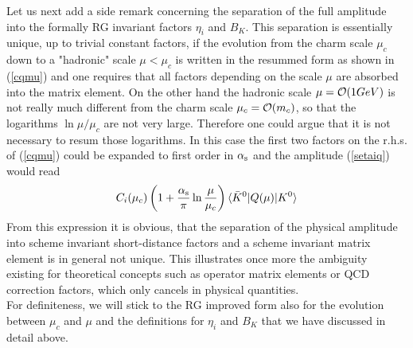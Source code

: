 Let us next add a side remark concerning the separation of the
full amplitude into the formally RG invariant factors $\eta_i$
and $B_K$.
This separation is essentially unique, up to trivial constant factors,
if the evolution from the charm scale $\mu_c$ down to a "hadronic"
scale $\mu<\mu_c$ is written in the resummed form as shown in
(\ref{cqmu}) and one requires that all factors depending on the scale
$\mu$ are absorbed into the matrix element. On the other hand the
hadronic scale $\mu={\cal O}(1 GeV)$ is not really much different
from the charm scale $\mu_c={\cal O}(m_c)$, so that the logarithms
$\ln\mu/\mu_c$ are not very large. Therefore one could argue that
it is not necessary to resum those logarithms. In this case the
first two factors on the r.h.s. of (\ref{cqmu}) could be expanded
to first order in $\alpha_{\rm s}$ and the amplitude (\ref{setaiq})
would read
\begin{equation}\label{ciqmumuc}
C_i(\mu_c)\left(1+\frac{\alpha_{\rm s}}{\pi}\ln\frac{\mu}{\mu_c}\right)
\langle\bar K^0|Q(\mu)|K^0\rangle
\end{equation}
From this expression it is obvious, that the separation of the
physical amplitude into scheme invariant short-distance factors
and a scheme invariant matrix element is in general not unique.
This illustrates once more the ambiguity existing for theoretical
concepts such as operator matrix elements or QCD correction factors,
which only cancels in physical quantities.
\\
For definiteness, we will stick to the RG improved form also for the
evolution between $\mu_c$ and $\mu$ and the definitions for
$\eta_i$ and $B_K$ that we have discussed in detail above.



